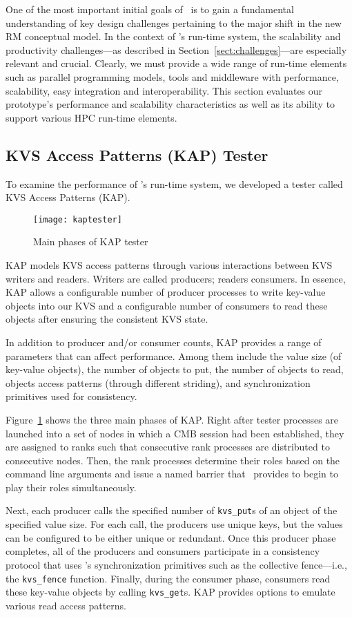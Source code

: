 One of the most important initial goals of \flux\ is to gain
a fundamental understanding of key design challenges pertaining
to the major shift in the new RM conceptual model.
In the context of \flux's run-time system, the scalability
and productivity
challenges---as described in Section~\ref{sect:challenges}---are especially
relevant and crucial. Clearly, we  must provide a wide range
of run-time elements such as parallel programming models,
tools and middleware with performance, scalability, easy integration
and interoperability.
This section evaluates our prototype's performance
and scalability characteristics as well as its ability
to support various HPC run-time elements.


\subsection{KVS Access Patterns (KAP) Tester}
To examine the performance of \flux's run-time system,
we developed a tester called KVS Access Patterns (KAP).
\begin{figure}
  \centering
  \texttt{[image: kaptester]}
  \caption{Main phases of KAP tester}
  \label{fig:kap}
\end{figure}
KAP models KVS access patterns through various interactions
between KVS writers and readers. Writers are called producers;
readers consumers.
In essence, KAP allows a configurable number of producer processes
to write key-value objects into our KVS 
and a configurable number of consumers to read these
objects after ensuring the consistent KVS state.

In addition to producer and/or consumer counts,
KAP provides a range of parameters that can affect performance.
Among them include the value size (of key-value objects),
the number of objects to put,
the number of objects to read, objects access 
patterns (through different striding), and
synchronization primitives used for consistency.

Figure~\ref{fig:kap} shows the three main phases of KAP.
Right after tester processes are launched into a set of nodes
in which a CMB session had been established,
they are assigned to ranks such that consecutive rank
processes are distributed to consecutive nodes.
Then, the rank processes determine their roles based
on the command line arguments and issue a named barrier
that \flux\ provides to begin to play their roles
simultaneously.

Next, each producer calls the specified number of
{\tt kvs\_put}s of an object of the specified value size.
For each call, the producers use unique keys, but
the values can be configured to be either unique
or redundant.
Once this producer phase completes, all of the producers and consumers
participate in a consistency protocol that uses
\flux's synchronization primitives such as the collective
fence---i.e., the {\tt kvs\_fence} function.
Finally, during the consumer phase, consumers read
these key-value objects by calling {\tt kvs\_get}s.
KAP provides options to emulate various read access
patterns.

